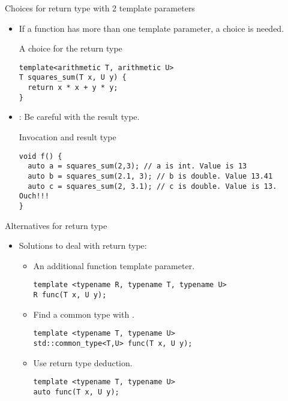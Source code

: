 \begin{frame}[t,fragile]{Choices for return type with 2 template parameters}

\begin{itemize}
  \item If a function has more than one template parameter, a choice is needed.

\begin{block}{A choice for the return type}
\begin{lstlisting}
template<arithmetic T, arithmetic U>
T squares_sum(T x, U y) {
  return x * x + y * y;
}
\end{lstlisting}
\end{block}

  \item {}: Be careful with the result type.

\begin{block}{Invocation and result type}
\begin{lstlisting}
void f() {
  auto a = squares_sum(2,3); // a is int. Value is 13
  auto b = squares_sum(2.1, 3); // b is double. Value 13.41
  auto c = squares_sum(2, 3.1); // c is double. Value is 13. Ouch!!!
}
\end{lstlisting}
\end{block}

\end{itemize}
\end{frame}

\begin{frame}[t,fragile]{Alternatives for return type}
\begin{itemize}
  \item Solutions to deal with return type:
    \begin{itemize}
      \item An additional function template parameter.
\begin{lstlisting}
template <typename R, typename T, typename U>
R func(T x, U y);
\end{lstlisting}

      \item Find a common type with .
\begin{lstlisting}
template <typename T, typename U>
std::common_type<T,U> func(T x, U y);
\end{lstlisting}

      \item Use return type deduction.
\begin{lstlisting}
template <typename T, typename U>
auto func(T x, U y);
\end{lstlisting}

    \end{itemize}
\end{itemize}
\end{frame}
